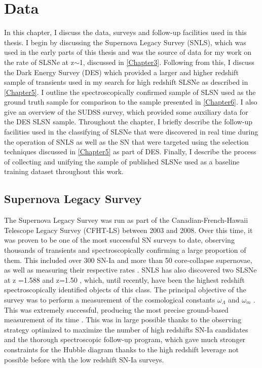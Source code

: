 \chapter{Data}
\label{Chapter2}

In this chapter, I discuss the data, surveys and follow-up facilities used in this thesis. I begin by discussing the Supernova Legacy Survey (SNLS), which was used in the early parts of this thesis and was the source of data for my work on the rate of SLSNe at z$\sim$1, discussed in \cref{Chapter3}. Following from this, I discuss the Dark Energy Survey (DES) which provided a larger and higher redshift sample of transients used in my search for high redshift SLSNe as described in \cref{Chapter5}. I outline the spectroscopically confirmed sample of SLSN used as the ground truth sample for comparison to the sample presented in \cref{Chapter6}. I also give an overview of the SUDSS survey, which provided some auxiliary data for the DES SLSN sample. Throughout the chapter, I briefly describe the follow-up facilities used in the classifying of SLSNe that were discovered in real time during the operation of SNLS as well as the SN that were targeted using the selection techniques discussed in \cref{Chapter5} as part of DES. Finally, I describe the process of collecting and unifying the sample of published SLSNe used as a baseline training dataset throughout this work.

\section{Supernova Legacy Survey}
The Supernova Legacy Survey \citep{Boulade2003,Pritchet2004} was run as part of the Canadian-French-Hawaii Telescope Legacy Survey (CFHT-LS) between 2003 and 2008. Over this time, it was proven to be one of the most successful SN surveys to date, observing thousands of transients and spectroscopically confirming a large proportion of them. This included over 300 SN-Ia \citep{Perrett2010} and more than 50 core-collapse supernovae, as well as measuring their respective rates \citep{Perrett2012,Bazin2009}. SNLS has also discovered two SLSNe at z =1.588 and z=1.50 \citep{Howell2013}, which, until recently, have been the highest redshift spectroscopically identified objects of this class. The principal objective of the survey was to perform a measurement of the cosmological constants $\omega_{\Lambda}$ and $\omega_{m}$ \citep{Astier2006}. This was extremely successful, producing the most precise ground-based measurement of its time \citep{Sullivan2006}. This was in large possible thanks to the observing strategy optimized to maximize the number of high redshifts SN-Ia candidates and the thorough spectroscopic follow-up program, which gave much stronger constraints for the Hubble diagram thanks to the high redshift leverage not possible before with the low redshift SN-Ia surveys.
% 
% 
% 

